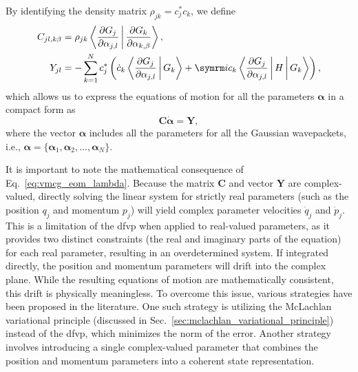By identifying the density matrix $\rho_{jk}=c_j^\ast c_k$, we define
\begin{align}
C_{jl,k\beta}&=\rho_{jk}\Braket{\frac{\partial G_j}{\partial \alpha_{j,l}}|\frac{\vphantom{G_j}\partial G_k}{\partial\alpha_{k,\beta}}},\\
Y_{jl}&=-\sum_{k=1}^Nc_j^\ast\left(\dot c_k\Braket{\frac{\partial G_j}{\partial\alpha_{j,l}}|G_k}+\i c_k\Braket{\frac{\partial G_j}{\partial\alpha_{j,l}}|H|G_k}\right),
\end{align}
which allows us to express the equations of motion for all the parameters $\symbf{\alpha}$ in a compact form as
\begin{equation}\label{eq:vmcg_eom_lambda}
\symbf{C}\dot{\symbf{\alpha}}=\symbf{Y},
\end{equation}
where the vector $\symbf{\alpha}$ includes all the parameters for all the Gaussian wavepackets, i.e., $\symbf{\alpha}=\lbrace\symbf{\alpha}_1,\symbf{\alpha}_2,\dots,\symbf{\alpha}_N\rbrace$.

It is important to note the mathematical consequence of Eq.~\eqref{eq:vmcg_eom_lambda}. Because the matrix $\symbf{C}$ and vector $\symbf{Y}$ are complex-valued, directly solving the linear system for strictly real parameters (such as the position $q_j$ and momentum $p_j$) will yield complex parameter velocities $\dot{q}_j$ and $\dot{p}_j$. This is a limitation of the \gls{dfvp} when applied to real-valued parameters, as it provides two distinct constraints (the real and imaginary parts of the equation) for each real parameter, resulting in an overdetermined system. If integrated directly, the position and momentum parameters will drift into the complex plane. While the resulting equations of motion are mathematically consistent, this drift is physically meaningless. To overcome this issue, various strategies have been proposed in the literature. One such strategy is utilizing the McLachlan variational principle (discussed in Sec.~\ref{sec:mclachlan_variational_principle}) instead of the \gls{dfvp}, which minimizes the norm of the error. Another strategy involves introducing a single complex-valued parameter that combines the position and momentum parameters into a coherent state representation.
